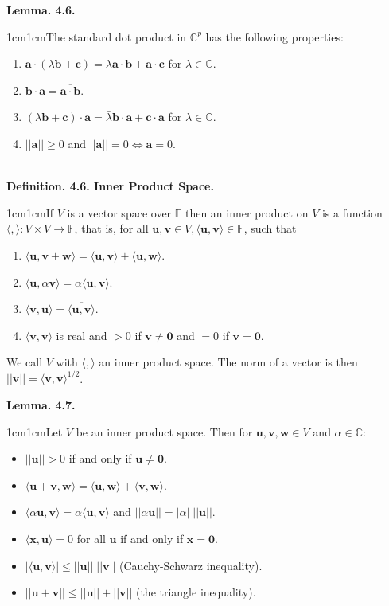 \documentclass{article}
\newcommand{\vect}[1]{\mathbf{#1}}
\newcommand{\definition}[2]{\textbf{Definition. #1.}\begin{adjustwidth}{1cm}{1cm}#2\end{adjustwidth}}
\newcommand{\lemma}[2]{\textbf{Lemma. #1.}\begin{adjustwidth}{1cm}{1cm}#2\end{adjustwidth}}
\begin{document}
\lemma{4.6}{The standard dot product in $\mathbb{C}^p$ has the following properties:
\begin{enumerate}
  \item $\vect{a} \cdot (\lambda \vect{b} + \vect{c}) = \lambda \vect{a} \cdot \vect{b} + \vect{a} \cdot \vect{c}$ for $\lambda \in \mathbb{C}$.
  \item $\vect{b} \cdot \vect{a} = \overline{\vect{a} \cdot \vect{b}}$.
  \item $(\lambda \vect{b} + \vect{c}) \cdot \vect{a} = \bar{\lambda} \vect{b} \cdot \vect{a} + \vect{c} \cdot \vect{a}$ for $\lambda \in \mathbb{C}$.
  \item $|| \vect{a} || \geq 0$ and $|| \vect{a} || = 0 \iff \vect{a} = 0$. 
\end{enumerate}}~\\
\definition{4.6. Inner Product Space}{If $V$ is a vector space over $\mathbb{F}$ then an inner product on $V$ is a function $\langle,\rangle: V \times V \rightarrow \mathbb{F}$, that is, for all $\vect{u}, \vect{v} \in V,  \langle\vect{u}, \vect{v}\rangle \in \mathbb{F}$, such that
\begin{enumerate}
  \item $\langle\vect{u}, \vect{v} + \vect{w}\rangle = \langle\vect{u}, \vect{v}\rangle + \langle\vect{u}, \vect{w}\rangle$.
  \item $\langle\vect{u}, \alpha \vect{v}\rangle = \alpha \langle\vect{u}, \vect{v}\rangle$.
  \item $\langle\vect{v}, \vect{u}\rangle = \overline{\langle\vect{u}, \vect{v}\rangle}$.
  \item $\langle\vect{v}, \vect{v}\rangle$ is real and $> 0$ if $\vect{v} \neq \vect{0}$ and $= 0$ if $\vect{v} = \vect{0}$.
\end{enumerate}
We call $V$ with $\langle , \rangle$ an inner product space. The norm of a vector is then $|| \vect{v} || = \langle \vect{v}, \vect{v} \rangle^{1/2}$.}\newpage
\lemma{4.7}{Let $V$ be an inner product space. Then for $\vect{u}, \vect{v}, \vect{w} \in V$ and $\alpha \in \mathbb{C}$:
\begin{itemize}
  \item $|| \vect{u} || > 0$ if and only if $\vect{u} \neq \vect{0}$.
  \item $\langle \vect{u} + \vect{v}, \vect{w} \rangle = \langle \vect{u}, \vect{w} \rangle + \langle \vect{v}, \vect{w} \rangle$.
  \item $\langle \alpha \vect{u}, \vect{v} \rangle = \bar{\alpha} \langle \vect{u}, \vect{v} \rangle$ and $|| \alpha \vect{u} || = | \alpha | \; || \vect{u} || $.
  \item $\langle \vect{x}, \vect{u} \rangle = 0$ for all $\vect{u}$ if and only if $\vect{x} = \vect{0}$.
  \item $| \langle \vect{u}, \vect{v} \rangle | \leq || \vect{u} || \; || \vect{v} ||$ (Cauchy-Schwarz inequality).
  \item $|| \vect{u} + \vect{v} || \leq || \vect{u} || + || \vect{v} ||$ (the triangle inequality).
\end{itemize}}~\\
\end{document}
